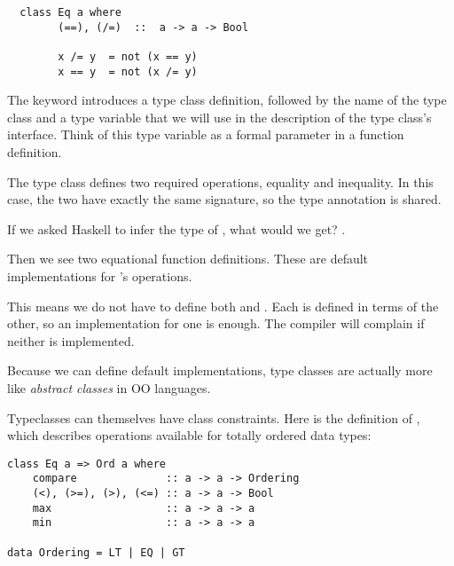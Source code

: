\begin{lstlisting}
  class Eq a where
        (==), (/=)  ::  a -> a -> Bool

        x /= y  = not (x == y)
        x == y  = not (x /= y)
\end{lstlisting}

\begin{notelist}
    \item The  keyword introduces a type class definition, followed by the
          name of the type class and a type variable that we will use in the description
          of the type class's interface. Think of this type variable as a formal parameter
          in a function definition. 

    \item The  type class defines two required operations, equality and inequality.
          In this case, the two have exactly the same signature, so the type annotation
          is shared.

    \item If we asked Haskell to infer the type of \code{(==)}, what would we get?
          .

    \item Then we see two equational function definitions. These are default implementations
          for 's operations.

    \item This means we do not have to define both \code{(==)} and \code{(/=)}. Each is defined
          in terms of the other, so an implementation for one is enough. The compiler will
          complain if neither is implemented.

    \item Because we can define default implementations, type classes are actually more like
          \textit{abstract classes} in OO languages.
\end{notelist}

Typeclasses can themselves have class constraints. Here is the definition of , which describes
operations available for totally ordered data types:

\begin{lstlisting}
class Eq a => Ord a where
    compare              :: a -> a -> Ordering
    (<), (>=), (>), (<=) :: a -> a -> Bool
    max                  :: a -> a -> a
    min                  :: a -> a -> a

data Ordering = LT | EQ | GT
\end{lstlisting}

